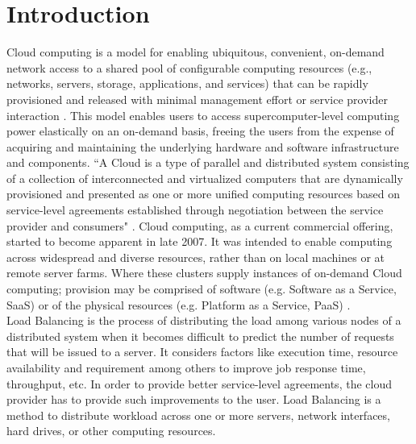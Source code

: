 \vspace{-1in}
\chapter{Introduction}
Cloud computing is a model for enabling ubiquitous, convenient, on-demand network access to a shared pool of configurable computing resources (e.g., networks, servers, storage, applications, and services) that can be rapidly provisioned and released with minimal management effort or service provider interaction \cite{NIST}. This model enables users to access supercomputer-level computing power elastically on an on-demand basis, freeing the users from the expense of acquiring and maintaining the underlying hardware and software infrastructure and components. ``A Cloud is a type of parallel and distributed system consisting of a collection of interconnected and virtualized computers that are dynamically provisioned and presented as one or more unified computing resources based on service-level agreements established through negotiation between the service provider and consumers" \cite {NIST}. Cloud computing, as a current commercial offering, started to become apparent in late 2007. It was intended to enable computing across widespread and diverse resources, rather than on local machines or at remote server farms. Where these clusters supply instances of on-demand Cloud computing; provision may be comprised of software (e.g. Software as a Service, SaaS) or of the physical resources (e.g. Platform as a Service, PaaS) \cite {Randles1}.\\[0.2cm]
Load Balancing is the process of distributing the load among various nodes of a distributed system when it becomes difficult to predict the number of requests that will be issued to a server. It considers factors like execution time, resource availability and requirement among others to improve job response time, throughput, etc. In order to provide better service-level agreements, the cloud provider has to provide such improvements to the user. Load Balancing is a method to distribute workload across one or more servers, network interfaces, hard drives, or other computing resources.

